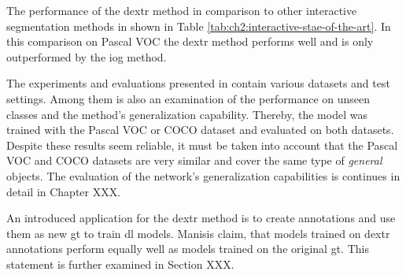 The performance of the \gls{dextr} method in comparison to other interactive segmentation methods in shown in Table \ref{tab:ch2:interactive-stae-of-the-art}.
In this comparison on Pascal VOC the \gls{dextr} method performs well and is only outperformed by the \gls{iog} method.

The experiments and evaluations presented in \cite{Man18-DEXTR} contain various datasets and test settings.
Among them is also an examination of the performance on unseen classes and the method's generalization capability.
Thereby, the model was trained with the Pascal VOC or COCO dataset and evaluated on both datasets.
Despite these results seem reliable, it must be taken into account that the Pascal VOC and COCO datasets are very similar and cover the same type of \textit{general} objects.
The evaluation of the network's generalization capabilities is continues in detail in Chapter XXX.

An introduced application for the \gls{dextr} method is to create annotations and use them as new \gls{gt} to train \gls{dl} models.
Manisis \etal claim, that models trained on \gls{dextr} annotations perform equally well as models trained on the original \gls{gt}\cite{Man18-DEXTR}.
This statement is further examined in Section XXX.
